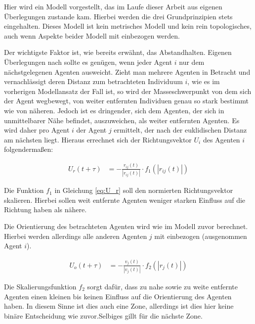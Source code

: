 Hier wird ein Modell vorgestellt, das im Laufe dieser Arbeit aus eigenen Überlegungen zustande kam.
Hierbei werden die drei Grundprinzipien stets eingehalten. Dieses Modell ist kein metrisches Modell und kein rein topologisches, auch wenn Aspekte beider Modell mit einbezogen werden.

Der wichtigste Faktor ist, wie bereits erwähnt, das Abstandhalten. Eigenen Überlegungen nach sollte es genügen, wenn jeder Agent $i$ nur dem nächstgelegenen Agenten ausweicht. Zieht man mehrere Agenten in Betracht und vernachlässigt deren Distanz zum betrachteten Individuum $i$, wie es im vorherigen Modellansatz der Fall ist, so wird der Masseschwerpunkt von dem sich der Agent wegbewegt, von weiter entfernten Individuen genau so stark bestimmt wie von näheren. Jedoch ist es dringender, sich dem Agenten, der sich in unmittelbarer Nähe befindet, auszuweichen, als weiter entfernten Agenten. 
Es wird daher pro Agent $i$ der Agent $j$ ermittelt, der nach der euklidischen Distanz am nächsten liegt.
Hieraus errechnet sich der Richtungsvektor $U_i$ des Agenten $i$ folgendermaßen:

\begin{subequations}
\begin{align}
U_{r}(t+\tau) &= - \frac{r_{ij}(t)}{|r_{ij}(t)|} \cdot f_{1}(|r_{ij}(t)|) \label{eq:U_r}
\end{align}
\end{subequations}

Die Funktion $f_1$ in Gleichung \ref{eq:U_r} soll den normierten Richtungsvektor skalieren. Hierbei sollen weit entfernte Agenten weniger starken Einfluss auf die Richtung haben als nähere.

Die Orientierung des betrachteten Agenten wird wie im Modell zuvor berechnet. Hierbei werden allerdings alle anderen Agenten $j$ mit einbezogen (ausgenommen Agent $i$).

\begin{subequations}
\begin{align}
U_{o}(t+\tau) &= - \frac{v_{j}(t)}{|v_{j}(t)|} \cdot f_{2}(|r_{j}(t)|) \label{eq:U_o}
\end{align}
\end{subequations}

Die Skalierungsfunktion $f_{2}$ sorgt dafür, dass zu nahe sowie zu weite entfernte Agenten einen kleinen bis keinen Einfluss auf die Orientierung des Agenten haben. In diesem Sinne ist dies auch eine Zone, allerdings ist dies hier keine binäre Entscheidung wie zuvor.Selbiges gillt für die nächste Zone.


